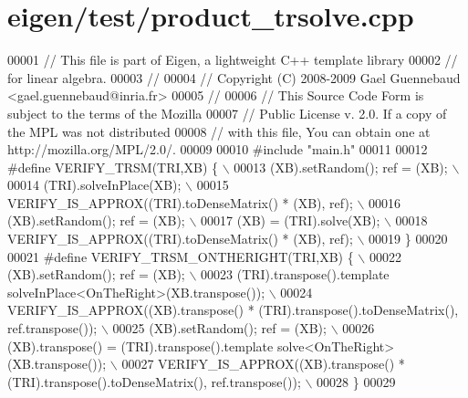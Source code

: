 \hypertarget{eigen_2test_2product__trsolve_8cpp_source}{}\section{eigen/test/product\+\_\+trsolve.cpp}
\label{eigen_2test_2product__trsolve_8cpp_source}

\begin{DoxyCode}
00001 \textcolor{comment}{// This file is part of Eigen, a lightweight C++ template library}
00002 \textcolor{comment}{// for linear algebra.}
00003 \textcolor{comment}{//}
00004 \textcolor{comment}{// Copyright (C) 2008-2009 Gael Guennebaud <gael.guennebaud@inria.fr>}
00005 \textcolor{comment}{//}
00006 \textcolor{comment}{// This Source Code Form is subject to the terms of the Mozilla}
00007 \textcolor{comment}{// Public License v. 2.0. If a copy of the MPL was not distributed}
00008 \textcolor{comment}{// with this file, You can obtain one at http://mozilla.org/MPL/2.0/.}
00009 
00010 \textcolor{preprocessor}{#include "main.h"}
00011 
00012 \textcolor{preprocessor}{#define VERIFY\_TRSM(TRI,XB) \{ \(\backslash\)}
00013 \textcolor{preprocessor}{    (XB).setRandom(); ref = (XB); \(\backslash\)}
00014 \textcolor{preprocessor}{    (TRI).solveInPlace(XB); \(\backslash\)}
00015 \textcolor{preprocessor}{    VERIFY\_IS\_APPROX((TRI).toDenseMatrix() * (XB), ref); \(\backslash\)}
00016 \textcolor{preprocessor}{    (XB).setRandom(); ref = (XB); \(\backslash\)}
00017 \textcolor{preprocessor}{    (XB) = (TRI).solve(XB); \(\backslash\)}
00018 \textcolor{preprocessor}{    VERIFY\_IS\_APPROX((TRI).toDenseMatrix() * (XB), ref); \(\backslash\)}
00019 \textcolor{preprocessor}{  \}}
00020 
00021 \textcolor{preprocessor}{#define VERIFY\_TRSM\_ONTHERIGHT(TRI,XB) \{ \(\backslash\)}
00022 \textcolor{preprocessor}{    (XB).setRandom(); ref = (XB); \(\backslash\)}
00023 \textcolor{preprocessor}{    (TRI).transpose().template solveInPlace<OnTheRight>(XB.transpose()); \(\backslash\)}
00024 \textcolor{preprocessor}{    VERIFY\_IS\_APPROX((XB).transpose() * (TRI).transpose().toDenseMatrix(), ref.transpose()); \(\backslash\)}
00025 \textcolor{preprocessor}{    (XB).setRandom(); ref = (XB); \(\backslash\)}
00026 \textcolor{preprocessor}{    (XB).transpose() = (TRI).transpose().template solve<OnTheRight>(XB.transpose()); \(\backslash\)}
00027 \textcolor{preprocessor}{    VERIFY\_IS\_APPROX((XB).transpose() * (TRI).transpose().toDenseMatrix(), ref.transpose()); \(\backslash\)}
00028 \textcolor{preprocessor}{  \}}
00029 

\end{DoxyCode}

